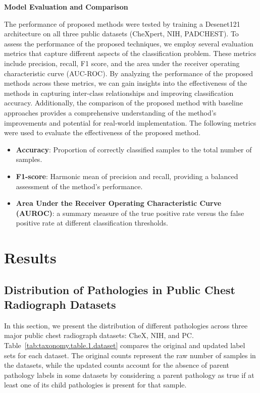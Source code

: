 \textbf{Model Evaluation and Comparison}

The performance of proposed methods were tested by training a Desenet121 architecture on all three public datasets (CheXpert, NIH, PADCHEST). To assess the performance of the proposed techniques, we employ several evaluation metrics that capture different aspects of the classification problem. These metrics include precision, recall, F1 score, and the area under the receiver operating characteristic curve (AUC-ROC). By analyzing the performance of the proposed methods across these metrics, we can gain insights into the effectiveness of the methods in capturing inter-class relationships and improving classification accuracy. Additionally, the comparison of the proposed method with baseline approaches provides a comprehensive understanding of the method's improvements and potential for real-world implementation. The following metrics were used to evaluate the effectiveness of the proposed method.

\begin{itemize}
    \item \textbf{Accuracy}: Proportion of correctly classified samples to the total number of samples.

    \item \textbf{F1-score}: Harmonic mean of precision and recall, providing a balanced assessment of the method's performance.

    \item \textbf{Area Under the Receiver Operating Characteristic Curve (AUROC)}: a summary measure of the true positive rate versus the false positive rate at different classification thresholds.
\end{itemize}



\section{Results}

\subsection{Distribution of Pathologies in Public Chest Radiograph Datasets}

In this section, we present the distribution of different pathologies across three major public chest radiograph datasets: CheX, NIH, and PC\@. Table~\ref*{tab:taxonomy.table.1.dataset} compares the original and updated label sets for each dataset. The original counts represent the raw number of samples in the datasets, while the updated counts account for the absence of parent pathology labels in some datasets by considering a parent pathology as true if at least one of its child pathologies is present for that sample.

